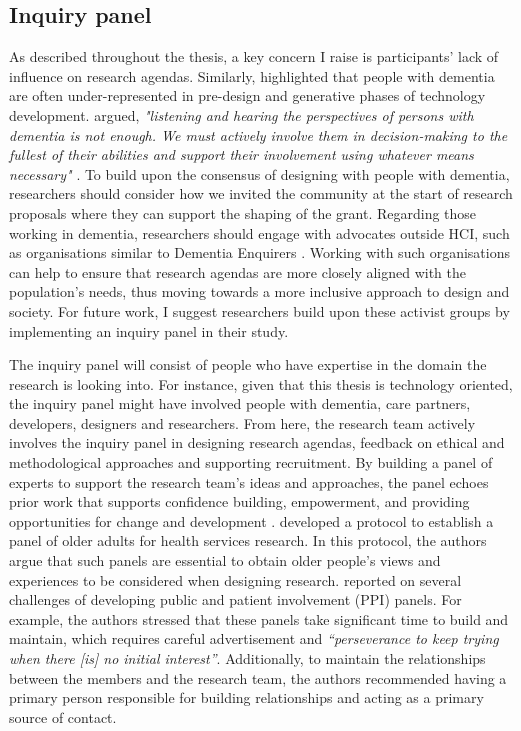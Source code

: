 \subsection{Inquiry panel}
\label{Inquiry Panel}
As described throughout the thesis, a key concern I raise is participants' lack of influence on research agendas. Similarly, \cite{suijkerbuijk_active_2019} highlighted that people with dementia are often under-represented in pre-design and generative phases of technology development. \cite{dupuis_moving_2012} argued, \textit{"listening and hearing the perspectives of persons with dementia is not enough. We must actively involve them in decision-making to the fullest of their abilities and support their involvement using whatever means necessary"} \citep[p.433]{dupuis_moving_2012}. To build upon the consensus of designing with people with dementia, researchers should consider how we invited the community at the start of research proposals where they can support the shaping of the grant. Regarding those working in dementia, researchers should engage with advocates outside HCI, such as organisations similar to Dementia Enquirers \citep{davies2021dementia}. Working with such organisations can help to ensure that research agendas are more closely aligned with the population's needs, thus moving towards a more inclusive approach to design and society. For future work, I suggest researchers build upon these activist groups by implementing an inquiry panel in their study.

The inquiry panel will consist of people who have expertise in the domain the research is looking into. For instance, given that this thesis is technology oriented, the inquiry panel might have involved people with dementia, care partners, developers, designers and researchers. From here, the research team actively involves the inquiry panel in designing research agendas, feedback on ethical and methodological approaches and supporting recruitment. By building a panel of experts to support the research team’s ideas and approaches, the panel echoes prior work that supports confidence building, empowerment, and providing opportunities for change and development \citep{reuter_older_2019}. \cite{conneely2020protocol} developed a protocol to establish a panel of older adults for health services research. In this protocol, the authors argue that such panels are essential to obtain older people's views and experiences to be considered when designing research. \cite{grier2018finding} reported on several challenges of developing public and patient involvement (PPI) panels. For example, the authors stressed that these panels take significant time to build and maintain, which requires careful advertisement and \textit{``perseverance to keep trying when there [is] no initial interest''}. Additionally, to maintain the relationships between the members and the research team, the authors recommended having a primary person responsible for building relationships and acting as a primary source of contact. 


